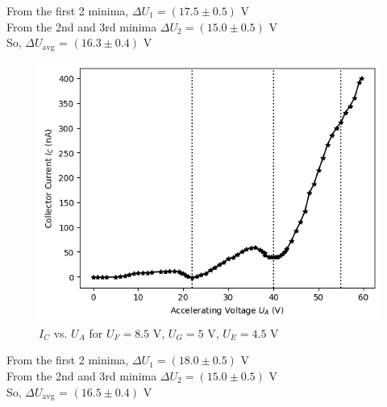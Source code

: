 \noindent From the first 2 minima, $\Delta U_1=(17.5 \pm 0.5)$  V\\
From the 2nd and 3rd minima $\Delta U_2=(15.0 \pm 0.5)$ V\\
So, $\Delta U_\text{avg}$ = $(16.3 \pm 0.4)$ V

\begin{figure}[H]
    \centering
    \includegraphics[width=1\columnwidth]{images/g2.png}
    \caption{$I_C$ vs. $U_A$ for $U_F = 8.5$ V, $U_{G} = 5$ V, $U_E=4.5$ V}
    \label{g2}
\end{figure}

\noindent From the first 2 minima, $\Delta U_1=(18.0 \pm 0.5)$  V\\
From the 2nd and 3rd minima $\Delta U_2=(15.0 \pm 0.5)$ V\\
So, $\Delta U_\text{avg}$ = $(16.5 \pm 0.4)$ V

